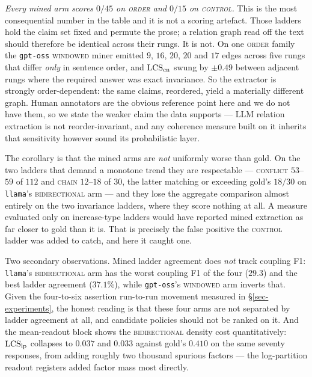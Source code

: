 \emph{Every mined arm scores $0/45$ on \textsc{order} and $0/15$ on \textsc{control}.} This is the most
consequential number in the table and it is not a scoring artefact. Those ladders hold the claim set
fixed and permute the prose; a relation graph read off the text should therefore be identical across
their rungs. It is not. On one \textsc{order} family the \texttt{gpt-oss} \textsc{windowed} miner
emitted $9$, $16$, $20$, $20$ and $17$ edges across five rungs that differ \emph{only} in sentence
order, and $\mathrm{LCS}_{\mathrm{cn}}$ swung by $\pm 0.49$ between adjacent rungs where the required answer was
exact invariance. So the extractor is strongly order-dependent: the same claims, reordered, yield a
materially different graph. Human annotators are the obvious reference point here and we do not have
them, so we state the weaker claim the data supports --- LLM relation extraction is not
reorder-invariant, and any coherence measure built on it inherits that sensitivity however sound its
probabilistic layer.

The corollary is that the mined arms are \emph{not} uniformly worse than gold. On the two ladders that
demand a monotone trend they are respectable --- \textsc{conflict} $53$--$59$ of $112$ and
\textsc{chain} $12$--$18$ of $30$, the latter matching or exceeding gold's $18/30$ on
\texttt{llama}'s \textsc{bidirectional} arm --- and they lose the aggregate comparison almost entirely
on the two invariance ladders, where they score nothing at all. A measure evaluated only on
increase-type ladders would have reported mined extraction as far closer to gold than it is. That is
precisely the false positive the \textsc{control} ladder was added to catch, and here it caught one.

Two secondary observations. Mined ladder agreement does \emph{not} track coupling F1: \texttt{llama}'s
\textsc{bidirectional} arm has the worst coupling F1 of the four ($29.3$) and the best ladder agreement
($37.1\%$), while \texttt{gpt-oss}'s \textsc{windowed} arm inverts that. Given the four-to-six
assertion run-to-run movement measured in \S\ref{sec-experiments}, the honest reading is that these
four arms are not separated by ladder agreement at all, and candidate policies should not be ranked on
it. And the mean-readout block shows the \textsc{bidirectional} density cost quantitatively:
$\mathrm{LCS}_{\mathrm{lp}}$ collapses to $0.037$ and $0.033$ against gold's $0.410$ on the same seventy responses,
from adding roughly two thousand spurious factors --- the log-partition readout registers added factor
mass most directly.

